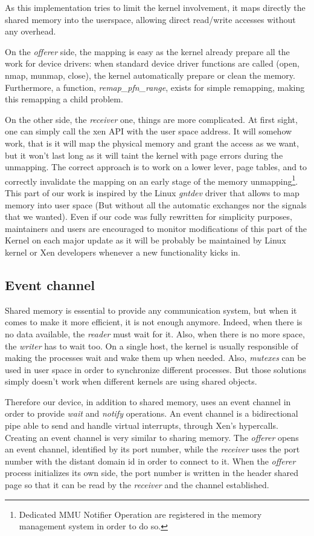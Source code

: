 \documentclass[journal]{IEEEtran}
\begin{document}
As this implementation tries to limit the kernel involvement, it maps directly the shared memory into the userspace, allowing direct read/write accesses without any overhead.

On the \emph{offerer} side, the mapping is easy as the kernel already prepare all the work for device drivers: when standard device driver functions are called (open, nmap, munmap, close), the kernel automatically prepare or clean the memory. Furthermore, a function, \emph{remap\_pfn\_range}, exists for simple remapping, making this remapping a child problem.

On the other side, the \emph{receiver} one, things are more complicated. At first sight, one can simply call the xen API with the user space address. It will somehow work, that is it will map the physical memory and grant the access as we want, but it won't last long as it will taint the kernel with page errors during the unmapping.
The correct approach is to work on a lower lever, page tables, and to correctly invalidate the mapping on an early stage of the memory unmapping\footnote{Dedicated MMU Notifier Operation are registered in the memory management system in order to do so.}.
This part of our work is inspired by the Linux \emph{gntdev} driver that allows to map memory into user space (But without all the automatic exchanges nor the signals that we wanted). Even if our code was fully rewritten for simplicity purposes, maintainers and users are encouraged to monitor modifications of this part of the Kernel on each major update as it will be probably be maintained by Linux kernel or Xen developers whenever a new functionality kicks in.

\subsection{Event channel}

Shared memory is essential to provide any communication system, but when it comes to make it more efficient, it is not enough anymore. Indeed, when there is no data available, the \emph{reader} must wait for it. Also, when there is no more space, the \emph{writer} has to wait too. On a single host, the kernel is usually responsible of making the processes wait and wake them up when needed. Also, \emph{mutexes} can be used in user space in order to synchronize different processes. But those solutions simply doesn't work when different kernels are using shared objects.

Therefore our device, in addition to shared memory, uses an event channel in order to provide \emph{wait} and \emph{notify} operations. An event channel is a bidirectional pipe able to send and handle virtual interrupts, through Xen's hypercalls. Creating an event channel is very similar to sharing memory. The \emph{offerer} opens an event channel, identified by its port number, while the \emph{receiver} uses the port number with the distant domain id in order to connect to it.
When the \emph{offerer} process initializes its own side, the port number is written in the header shared page so that it can be read by the \emph{receiver} and the channel established. 
\end{document}
